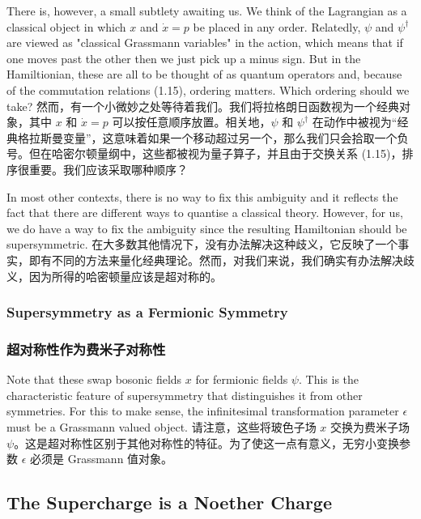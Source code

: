 \documentclass{ctexart}
\begin{document}
\begin{paracol}{2}
There is, however, a small subtlety awaiting us. We think of the Lagrangian as a classical object in which $x$ and $\dot{x} = p$ be placed in any order. Relatedly, $\psi$ and $\psi^{\dagger}$ are viewed as "classical Grassmann variables" in the action, which means that if one moves past the other then we just pick up a minus sign. But in the Hamiltionian, these are all to be thought of as quantum operators and, because of the commutation relations (1.15), ordering matters. Which ordering should we take?
\switchcolumn
然而，有一个小微妙之处等待着我们。我们将拉格朗日函数视为一个经典对象，其中 $x$ 和 $\dot{x} = p$ 可以按任意顺序放置。相关地，$\psi$ 和 $\psi^{\dagger}$ 在动作中被视为“经典格拉斯曼变量”，这意味着如果一个移动超过另一个，那么我们只会拾取一个负号。但在哈密尔顿量纲中，这些都被视为量子算子，并且由于交换关系 (1.15)，排序很重要。我们应该采取哪种顺序？
\switchcolumn*

In most other contexts, there is no way to fix this ambiguity and it reflects the fact that there are different ways to quantise a classical theory. However, for us, we do have a way to fix the ambiguity since the resulting Hamiltonian should be supersymmetric.
\switchcolumn
在大多数其他情况下，没有办法解决这种歧义，它反映了一个事实，即有不同的方法来量化经典理论。然而，对我们来说，我们确实有办法解决歧义，因为所得的哈密顿量应该是超对称的。
\switchcolumn*

\subsubsection{Supersymmetry as a Fermionic Symmetry}
\switchcolumn
\subsubsection*{超对称性作为费米子对称性}
\switchcolumn*

Note that these swap bosonic fields $x$ for fermionic fields $\psi$. This is the characteristic feature of supersymmetry that distinguishes it from other symmetries. For this to make sense, the infinitesimal transformation parameter $\epsilon$ must be a Grassmann valued object.
\switchcolumn
请注意，这些将玻色子场 $x$ 交换为费米子场 $\psi$。这是超对称性区别于其他对称性的特征。为了使这一点有意义，无穷小变换参数 $\epsilon$ 必须是 Grassmann 值对象。
\switchcolumn*

\subsection*{The Supercharge is a Noether Charge}
\switchcolumn

\end{paracol}
\end{document}
